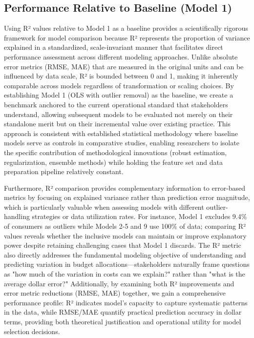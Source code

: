 \subsection{Performance Relative to Baseline (Model 1)}

Using R² values relative to Model 1 as a baseline provides a scientifically rigorous framework for model comparison because R² represents the proportion of variance explained in a standardized, scale-invariant manner that facilitates direct performance assessment across different modeling approaches. Unlike absolute error metrics (RMSE, MAE) that are measured in the original units and can be influenced by data scale, R² is bounded between 0 and 1, making it inherently comparable across models regardless of transformation or scaling choices. By establishing Model 1 (OLS with outlier removal) as the baseline, we create a benchmark anchored to the current operational standard that stakeholders understand, allowing subsequent models to be evaluated not merely on their standalone merit but on their incremental value over existing practice. This approach is consistent with established statistical methodology where baseline models serve as controls in comparative studies, enabling researchers to isolate the specific contribution of methodological innovations (robust estimation, regularization, ensemble methods) while holding the feature set and data preparation pipeline relatively constant.

Furthermore, R² comparison provides complementary information to error-based metrics by focusing on explained variance rather than prediction error magnitude, which is particularly valuable when assessing models with different outlier-handling strategies or data utilization rates. For instance, Model 1 excludes 9.4\% of consumers as outliers while Models 2-5 and 9 use 100\% of data; comparing R² values reveals whether the inclusive models can maintain or improve explanatory power despite retaining challenging cases that Model 1 discards. The R² metric also directly addresses the fundamental modeling objective of understanding and predicting variation in budget allocations—stakeholders naturally frame questions as "how much of the variation in costs can we explain?" rather than "what is the average dollar error?" Additionally, by examining both R² improvements and error metric reductions (RMSE, MAE) together, we gain a comprehensive performance profile: R² indicates model's capacity to capture systematic patterns in the data, while RMSE/MAE quantify practical prediction accuracy in dollar terms, providing both theoretical justification and operational utility for model selection decisions.

